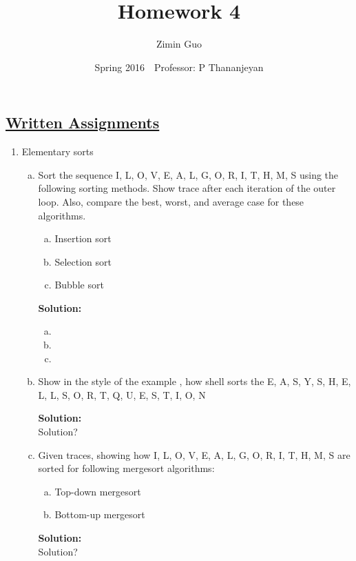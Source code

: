 \documentclass{article}\usepackage{amsmath,amssymb,amsthm,tikz,tkz-graph,color,chngpage,soul,hyperref,csquotes,graphicx,floatrow}\newcommand*{\QEDB}{\hfill\ensuremath{\square}}\newtheorem*{prop}{Proposition}\renewcommand{\theenumi}{\alph{enumi}}\usepackage[shortlabels]{enumitem}\usepackage[nobreak=true]{mdframed}\usetikzlibrary{matrix,calc}\MakeOuterQuote{"}\usepackage[margin=0.75in]{geometry} \newtheorem{theorem}{Theorem}
\title{Homework 4}
\author{Zimin Guo }
\date{Spring 2016$\quad$Professor: P Thananjeyan}
\begin{document}
\maketitle


\subsection*{\underline{Written Assignments}}
\begin{enumerate}[1.]
\item Elementary sorts
\begin{enumerate}[a)]
\item Sort the sequence I, L, O, V, E, A, L, G, O, R, I, T, H, M, S using the following sorting methods. Show trace after each iteration of the outer loop. Also, compare the best, worst, and average case for these algorithms.
\begin{enumerate}[a.]
\item Insertion sort
\item Selection sort
\item Bubble sort
\end{enumerate}
\begin{mdframed}
\textbf{Solution:} 
\begin{enumerate}[a.]
\item
\item
\item
\end{enumerate}
\end{mdframed}

\item Show in the style of the example , how shell sorts the E, A, S, Y, S, H, E, L, L, S, O, R, T, Q, U, E, S, T, I, O, N
\begin{mdframed}
\textbf{Solution:} \\
Solution?
\end{mdframed}

\item Given traces, showing how I, L, O, V, E, A, L, G, O, R, I, T, H, M, S are sorted for following mergesort algorithms:
\begin{enumerate}[a.]
\item Top-down mergesort
\item Bottom-up mergesort
\end{enumerate}
\begin{mdframed}
\textbf{Solution:} \\
Solution?
\end{mdframed}


\end{enumerate}
\end{enumerate}
\end{document}
